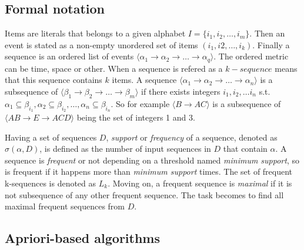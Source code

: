 \subsection{Formal notation}\label{ss:formal_notation}

Items are literals that belongs to a given alphabet $I=\{i_{1}, i_{2}, \dots,
i_{m}\}$. Then an event is stated as a non-empty unordered set of items
$(i_{1}, i{2}, \dots, i_{k})$. Finally a sequence is an ordered list of
events $\langle\alpha_{1} \rightarrow \alpha_{2} \rightarrow \dots \rightarrow
\alpha_{q}\rangle$. The ordered metric can be time, space or other. When a
sequence is refered as a $k-sequence$ means that this sequence contains $k$
items. A sequence $\langle\alpha_{1} \rightarrow \alpha_{2} \rightarrow \dots 
\rightarrow \alpha_{n}\rangle$ is a subsequence of $\langle\beta_{1} \rightarrow 
\beta_{2} \rightarrow \dots \rightarrow \beta_{m}\rangle$ if there exists
integers $i_{1}, i_{2}, \dots i_{n}$ s.t. $\alpha_{1} \subseteq \beta_{i_{1}}, 
\alpha_{2} \subseteq \beta_{i_{2}}, \dots, \alpha_{n} \subseteq \beta_{i_{n}}$.
So for example $\langle B \rightarrow AC\rangle$ is a subsequence of 
$\langle AB \rightarrow E \rightarrow ACD \rangle$ being the set of integers 1
and 3.

Having a set of sequences $D$, {\it support} or {\it frequency} of a sequence,
denoted as $\sigma(\alpha, D)$, is defined as the number of input sequences in $D$
that contain $\alpha$. A sequence is {\it frequent} or not depending on a
threshold named {\it minimum support}, so is frequent if it happens more than
{\it minimum support} times. The set of frequent k-sequences is denoted as
$L_{k}$. Moving on, a frequent sequence is {\it maximal} if it is not subsequence
of any other frequent sequence. The task becomes to find all maximal frequent
sequences from $D$.


\subsection{Apriori-based algorithms}\label{ss:apriori_based}

